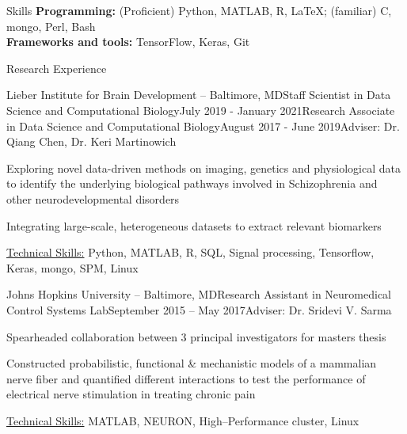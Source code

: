 \documentclass{resume}
\begin{document}
    \begin{rSection}{Skills}
\textbf{Programming:} (Proficient) Python, MATLAB, R, \LaTeX; (familiar) C, mongo, Perl, Bash \\
\textbf{Frameworks and tools:} TensorFlow, Keras, Git
\end{rSection} 
  \begin{rSection}{Research Experience}
\begin{rSubsectionPromotion}{Lieber Institute for Brain Development -- Baltimore, MD}{}{Staff Scientist in Data Science and Computational Biology}{July 2019 - January 2021}{Research Associate in Data Science and Computational Biology}{August 2017 - June 2019}{Adviser: Dr. Qiang Chen, Dr. Keri Martinowich}
\item Exploring novel data-driven methods on imaging, genetics and physiological data to identify the underlying biological pathways involved in Schizophrenia and other neurodevelopmental disorders
\item Integrating large-scale, heterogeneous datasets to extract relevant biomarkers
\item \uline{Technical Skills:} Python, MATLAB, R, SQL, Signal processing, Tensorflow, Keras, mongo, SPM, Linux
    \end{rSubsectionPromotion}

    \begin{rSubsection}{Johns Hopkins University -- Baltimore, MD}{}{Research Assistant in Neuromedical Control Systems Lab}{September 2015 -- May 2017}{Adviser: Dr. Sridevi V. Sarma}
\item Spearheaded collaboration between 3 principal investigators for masters thesis
\item Constructed probabilistic, functional \& mechanistic models of a mammalian nerve fiber and quantified different interactions to test the performance of electrical nerve stimulation in treating chronic pain
\item \uline{Technical Skills:} MATLAB, NEURON, High--Performance cluster, Linux
    \end{rSubsection}
  

\end{rSection}
\end{document}
